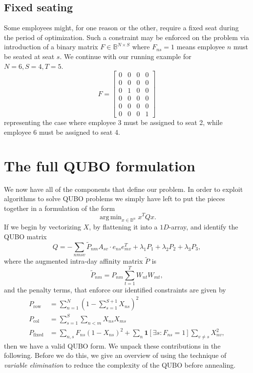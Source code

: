 \documentclass[10pt]{article}
\DeclareMathOperator*{\argmin}{arg\,min}
\theoremstyle{definition}
\theoremstyle{plain}
\theoremstyle{remark}
\begin{document}
	\subsection{Fixed seating}
	Some employees might, for one reason or the other, require a fixed seat during the period of optimization. Such a constraint may be enforced on the problem via introduction of a binary matrix $F\in\mathbb{B}^{N\times S}$ where $F_{ns} = 1$ means employee $n$ must be seated at seat $s$. We continue with our running example for $N=6, S=4, T=5$.
	\begin{equation}
		F = \begin{bmatrix}
			0 & 0 & 0 & 0 \\
			0 & 0 & 0 & 0 \\
			0 & 1 & 0 & 0 \\
			0 & 0 & 0 & 0 \\
			0 & 0 & 0 & 0 \\
			0 & 0 & 0 & 1
		\end{bmatrix}
	\end{equation}
	representing the case where employee 3 must be assigned to seat 2, while employee 6 must be assigned to seat 4.

	
	\section{The full QUBO formulation}
	We now have all of the components that define our problem. In order to exploit algorithms to solve QUBO problems we simply have left to put the pieces together in a formulation of the form
	\begin{equation}
		\argmin_{x\in\mathbb{B}^n} x^T Q x.
	\end{equation} 
	If we begin by vectorizing $X$, by flattening it into a $1D$-array, and identify the QUBO matrix
	\begin{equation}
		Q = - \sum_{nmsv}\tilde{P}_{nm} A_{sv}\cdot e_{ns} e_{mv}^T + \lambda_1 P_1 + \lambda_2 P_2 + \lambda_3 P_3,
	\end{equation}
	where the augmented intra-day affinity matrix $\tilde{P}$ is
	\begin{equation}
		\tilde{P}_{nm} = P_{nm}\sum_{t=1}^T W_{nt}W_{mt},
	\end{equation}
	and the penalty terms, that enforce our identified constraints are given by
	\begin{align}
		P_{\text{row}} &= \sum_{n=1}^{N} \left(1 - \sum_{s=1}^{S+1} X_{ns}\right)^2\\
		P_{\text{col}} &= \sum_{s=1}^{S} \sum_{n < m} X_{ns} X_{ms}\\
		P_{\text{fixed}} &= \sum_{n,s} F_{ns}(1 - X_{ns})^2 
		+ \sum_{n} \mathbf{1}[\exists s : F_{ns} = 1] \sum_{v \neq s} X_{nv}^2,
	\end{align} 
	then we have a valid QUBO form. We unpack these contributions in the following. Before we do this, we give an overview of using the technique of \textit{variable elimination} to reduce the complexity of the QUBO before annealing.	
	
\end{document}
